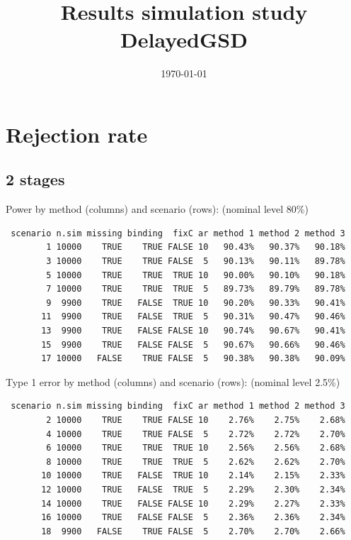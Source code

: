 \documentclass[12pt]{article}
\date{\today}
\title{Results simulation study DelayedGSD}
\begin{document}
\maketitle

\section{Rejection rate}
\label{sec:org9967f53}

\subsection{2 stages}
\label{sec:org441330b}
Power by method (columns) and scenario (rows): \hfill (nominal level 80\%)
\begin{verbatim}
 scenario n.sim missing binding  fixC ar method 1 method 2 method 3
        1 10000    TRUE    TRUE FALSE 10   90.43%   90.37%   90.18%
        3 10000    TRUE    TRUE FALSE  5   90.13%   90.11%   89.78%
        5 10000    TRUE    TRUE  TRUE 10   90.00%   90.10%   90.18%
        7 10000    TRUE    TRUE  TRUE  5   89.73%   89.79%   89.78%
        9  9900    TRUE   FALSE  TRUE 10   90.20%   90.33%   90.41%
       11  9900    TRUE   FALSE  TRUE  5   90.31%   90.47%   90.46%
       13  9900    TRUE   FALSE FALSE 10   90.74%   90.67%   90.41%
       15  9900    TRUE   FALSE FALSE  5   90.67%   90.66%   90.46%
       17 10000   FALSE    TRUE FALSE  5   90.38%   90.38%   90.09%
\end{verbatim}

\bigskip

Type 1 error by method (columns) and scenario (rows): \hfill (nominal level 2.5\%)
\begin{verbatim}
 scenario n.sim missing binding  fixC ar method 1 method 2 method 3
        2 10000    TRUE    TRUE FALSE 10    2.76%    2.75%    2.68%
        4 10000    TRUE    TRUE FALSE  5    2.72%    2.72%    2.70%
        6 10000    TRUE    TRUE  TRUE 10    2.56%    2.56%    2.68%
        8 10000    TRUE    TRUE  TRUE  5    2.62%    2.62%    2.70%
       10 10000    TRUE   FALSE  TRUE 10    2.14%    2.15%    2.33%
       12 10000    TRUE   FALSE  TRUE  5    2.29%    2.30%    2.34%
       14 10000    TRUE   FALSE FALSE 10    2.29%    2.27%    2.33%
       16 10000    TRUE   FALSE FALSE  5    2.36%    2.36%    2.34%
       18  9900   FALSE    TRUE FALSE  5    2.70%    2.70%    2.66%
\end{verbatim}

\clearpage
\end{document}
